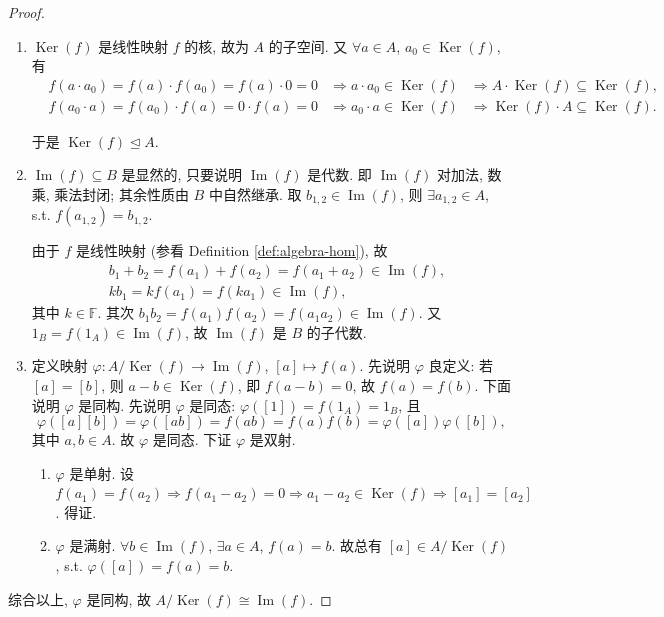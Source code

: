 \begin{proof}
\mbox{}\par\vspace{-0.2em}
\begin{enumerate}
\item $\operatorname{Ker}(f)$ 是线性映射 $f$ 的核, 故为 $A$ 的子空间. 又 $\forall a\in A$, $a_0\in\operatorname{Ker}(f)$, 有
\[\begin{aligned}
  &f(a\cdot a_0) = f(a)\cdot f(a_0)=f(a)\cdot 0=0
  &\Rightarrow a\cdot a_0\in\operatorname{Ker}(f)
  &\Rightarrow A\cdot\operatorname{Ker}(f)\subseteq\operatorname{Ker}(f),\\
  &f(a_0\cdot a) = f(a_0)\cdot f(a)=0\cdot f(a)=0
  &\Rightarrow a_0\cdot a\in\operatorname{Ker}(f)
  &\Rightarrow \operatorname{Ker}(f)\cdot A\subseteq\operatorname{Ker}(f).
\end{aligned}\]

于是 $\operatorname{Ker}(f)\trianglelefteq A$.

\item $\operatorname{Im}(f)\subseteq B$ 是显然的, 只要说明 $\operatorname{Im}(f)$ 是代数.
即 $\operatorname{Im}(f)$ 对加法, 数乘, 乘法封闭;
其余性质由 $B$ 中自然继承.
取 $b_{1,2}\in\operatorname{Im}(f)$, 则 $\exists a_{1,2}\in A$, s.t. $f(a_{1,2})=b_{1,2}$.

由于 $f$ 是线性映射 (参看 Definition \ref{def:algebra-hom}), 故
\[\begin{aligned}
  &b_1+b_2 = f(a_1)+f(a_2)=f(a_1+a_2)\in\operatorname{Im}(f),\\
  &kb_1 = kf(a_1)=f(ka_1)\in\operatorname{Im}(f),
\end{aligned}\]
其中 $k\in \mathbb{F}$. 其次 $b_1b_2=f(a_1)f(a_2)=f(a_1a_2)\in\operatorname{Im}(f)$.
又 $1_B=f(1_A)\in\operatorname{Im}(f)$, 故 $\operatorname{Im}(f)$ 是 $B$ 的子代数.

\item 定义映射 $\varphi\colon A/\operatorname{Ker}(f)\to\operatorname{Im}(f)$, $[a]\mapsto f(a)$.
先说明 $\varphi$ 良定义: 若 $[a]=[b]$, 则 $a-b\in\operatorname{Ker}(f)$, 即 $f(a-b)=0$, 故 $f(a)=f(b)$.
下面说明 $\varphi$ 是同构. 先说明 $\varphi$ 是同态:
$\varphi([1])=f(1_A)=1_B$, 且
\[
  \varphi([a][b])=\varphi([ab])=f(ab)=f(a)f(b)=\varphi([a])\varphi([b]),
\]
其中 $a,b\in A$. 故 $\varphi$ 是同态. 下证 $\varphi$ 是双射.

\begin{enumerate}
\item $\varphi$ 是单射. 设 $f(a_1)=f(a_2)\Rightarrow f(a_1-a_2)=0
\Rightarrow a_1-a_2\in\operatorname{Ker}(f)\Rightarrow[a_1]=[a_2]$. 得证.

\item $\varphi$ 是满射. $\forall b\in\operatorname{Im}(f)$, $\exists a\in A$, $f(a)=b$.
故总有 $[a]\in A/\operatorname{Ker}(f)$, s.t. $\varphi([a])=f(a)=b$.

\end{enumerate}
\end{enumerate}

综合以上, $\varphi$ 是同构, 故 $A/\operatorname{Ker}(f)\cong\operatorname{Im}(f)$.
\end{proof}

